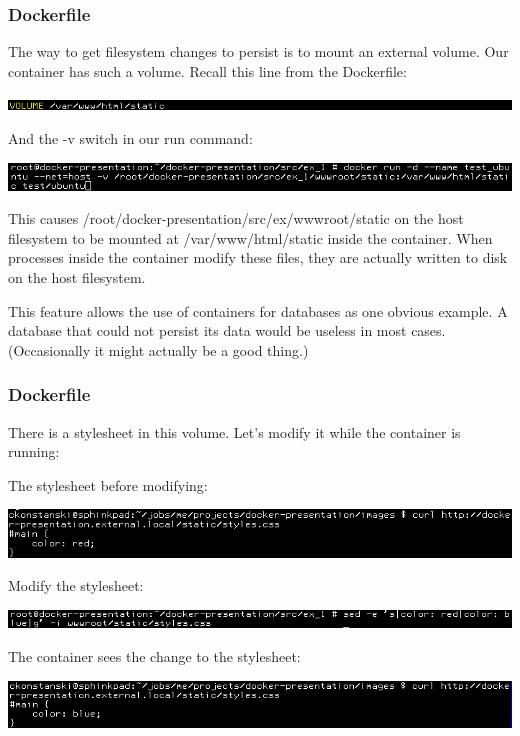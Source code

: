 \documentclass[helvetica,english,utf8,notitle,nologo]{beamer}
\begin{document}
\begin{frame}
  \frametitle{Dockerfile}

  The way to get filesystem changes to persist is to mount an external
  volume. Our container has such a volume. Recall this line from the
  Dockerfile:

  \includegraphics[scale=0.44]{image_17}

  And the -v switch in our run command:

  \includegraphics[scale=0.44]{image_18}

  This causes
  /root/docker-presentation/src/ex/wwwroot/static on
  the host filesystem to be mounted at /var/www/html/static inside the
  container. When processes inside the container modify these files,
  they are actually written to disk on the host filesystem.

  This feature allows the use of containers for databases as one
  obvious example. A database that could not persist its data would be
  useless in most cases. (Occasionally it might actually be a good
  thing.)
\end{frame}

\begin{frame}
  \frametitle{Dockerfile}

  There is a stylesheet in this volume. Let's modify it while the
  container is running:

  The stylesheet before modifying:

  \includegraphics[scale=0.44]{image_19}

  Modify the stylesheet:

  \includegraphics[scale=0.44]{image_20}

  The container sees the change to the stylesheet:

  \includegraphics[scale=0.44]{image_21}
\end{frame}
\end{document}
